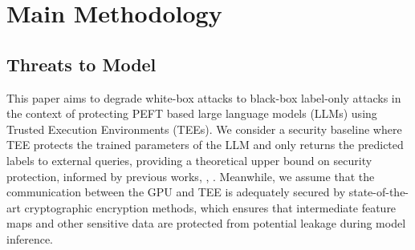 \documentclass{article}
\begin{document}
\section{Main Methodology}
\label{method}

\subsection{Threats to Model}
\label{Threats}

This paper aims to degrade white-box attacks to black-box label-only attacks in the context of protecting PEFT based large language models (LLMs) using Trusted Execution Environments (TEEs). We consider a security baseline where TEE protects the trained parameters of the LLM and only returns the predicted labels to external queries, providing a theoretical upper bound on security protection, informed by previous works\cite{zhang2024no}, \cite{shen2022soter}, \cite{hou2021model}. Meanwhile, we assume that the communication between the GPU and TEE is adequately secured by state-of-the-art cryptographic encryption methods, which ensures that intermediate feature maps and other sensitive data are protected from potential leakage during model inference.
\end{document}
